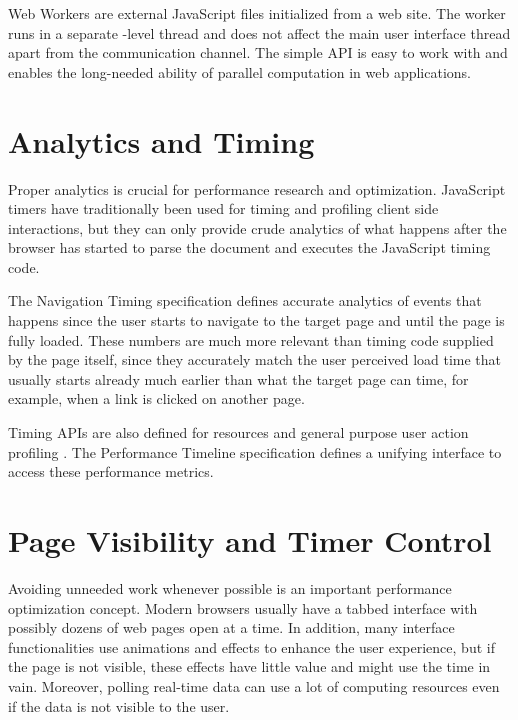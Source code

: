 Web Workers are external JavaScript files initialized from a web
site. The worker runs in a separate -level thread and does
not affect the main user interface thread apart from the communication
channel. The simple API is easy to work with and enables the
long-needed ability of parallel computation in web applications.

\section{Analytics and Timing}

Proper analytics is crucial for performance research and
optimization. JavaScript timers have traditionally been used for
timing and profiling client side interactions, but they can only
provide crude analytics of what happens after the browser has started
to parse the document and executes the JavaScript timing code.

The Navigation Timing specification \cite{NavigationTiming} defines
accurate analytics of events that happens since the user starts to
navigate to the target page and until the page is fully loaded. These
numbers are much more relevant than timing code supplied by the page
itself, since they accurately match the user perceived load time that
usually starts already much earlier than what the target page can
time, for example, when a link is clicked on another page.

Timing APIs are also defined for resources \cite{ResourceTiming} and
general purpose user action profiling \cite{UserTiming}. The
Performance Timeline specification \cite{PerformanceTimeline} defines
a unifying interface to access these performance metrics.

\section{Page Visibility and Timer Control}

Avoiding unneeded work whenever possible is an important performance
optimization concept. Modern browsers usually have a tabbed interface
with possibly dozens of web pages open at a time. In addition, many
interface functionalities use animations and effects to enhance the
user experience, but if the page is not visible, these effects have
little value and might use the  time in vain. Moreover,
polling real-time data can use a lot of computing resources even if
the data is not visible to the user.

